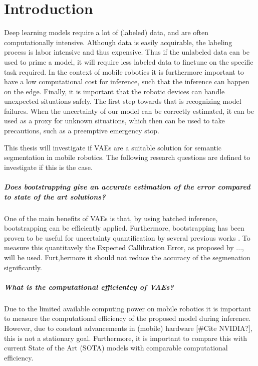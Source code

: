 \chapter{Introduction}\label{chapter:introduction}

Deep learning models require a lot of (labeled) data, and are often computationally intensive. Although data is easily acquirable, the labeling process is labor intensive and thus expensive. Thus if the unlabeled data can be used to prime a model, it will require less labeled data to finetune on the specific task required. In the context of mobile robotics it is furthermore important to have a low computational cost for inference, such that the inference can happen on the edge. Finally, it is important that the robotic devices can handle unexpected situations safely. The first step towards that is recognizing model failures. When the uncertainty of our model can be correctly estimated, it can be used as a proxy for unknown situations, which then can be used to take precautions, such as a preemptive emergency stop.

This thesis will investigate if VAEs are a suitable solution for semantic segmentation in mobile robotics. The following research questions are defined to investigate if this is the case.

\paragraph*{Does bootstrapping give an accurate estimation of the error compared to state of the art solutions?} One of the main benefits of VAEs is that, by using batched inference, bootstrapping can be efficiently applied. Furthermore, bootstrapping has been proven to be useful for uncertainty quantification by several previous works \cite{chen2018use,kohl2018probabilistic,edupuganti2021uq_mri}. To measure this quantitavely the Expected Callibration Error, as proposed by ..., will be used. Furt,hermore it should not reduce the accuracy of the segmenation significantly.

\paragraph*{What is the computational efficientcy of VAEs?} Due to the limited available computing power on mobile robotics it is important to measure the computational efficiency of the proposed model during inference. However, due to constant advancements in (mobile) hardware [\#Cite NVIDIA?], this is not a stationary goal. Furthermore, it is important to compare this with current State of the Art (SOTA) models with comparable computational efficiency.


